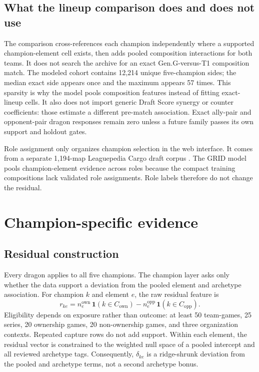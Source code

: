 \documentclass[10pt,letterpaper]{article}
\begin{document}
\subsection{What the lineup comparison does and does not use}
The comparison cross-references each champion independently where a supported champion-element cell exists, then adds pooled composition interactions for both teams. It does not search the archive for an exact Gen.G-versus-T1 composition match. The modeled cohort contains 12,214 unique five-champion sides; the median exact side appears once and the maximum appears 57 times. This sparsity is why the model pools composition features instead of fitting exact-lineup cells. It also does not import generic Draft Score synergy or counter coefficients: those estimate a different pre-match association. Exact ally-pair and opponent-pair dragon responses remain zero unless a future family passes its own support and holdout gates.

Role assignment only organizes champion selection in the web interface. It comes from a separate 1,194-map Leaguepedia Cargo draft corpus \cite{leaguepedia}. The GRID model pools champion-element evidence across roles because the compact training compositions lack validated role assignments. Role labels therefore do not change the residual.

\section{Champion-specific evidence}

\subsection{Residual construction}
Every dragon applies to all five champions. The champion layer asks only whether the data support a deviation from the pooled element and archetype association. For champion $k$ and element $e$, the raw residual feature is
\begin{equation}
r_{ke}
=n^{\mathrm{own}}_e\,\mathbf 1(k\in C_{\mathrm{own}})
-n^{\mathrm{opp}}_e\,\mathbf 1(k\in C_{\mathrm{opp}}).
\end{equation}
Eligibility depends on exposure rather than outcome: at least 50 team-games, 25 series, 20 ownership games, 20 non-ownership games, and three organization contexts. Repeated capture rows do not add support. Within each element, the residual vector is constrained to the weighted null space of a pooled intercept and all reviewed archetype tags. Consequently, $\delta_{ke}$ is a ridge-shrunk deviation from the pooled and archetype terms, not a second archetype bonus.
\end{document}
